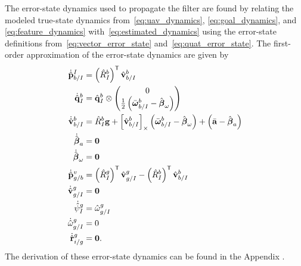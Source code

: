 The error-state dynamics used to propagate the filter are found by relating
the modeled true-state dynamics from~\eqref{eq:uav_dynamics},
\eqref{eq:goal_dynamics}, and \eqref{eq:feature_dynamics}
with~\eqref{eq:estimated_dynamics} using the error-state definitions
from~\eqref{eq:vector_error_state} and~\eqref{eq:quat_error_state}. The
first-order approximation of the error-state dynamics are given by 
\begin{align}
  \dot{\hat{\boldsymbol{\mathrm{p}}}}_{b/I}^I
  &=
  \left( \hat{R}_I^b \right)^{\mathsf{T}} \hat{\boldsymbol{\mathrm{v}}}_{b/I}^b
  \\
  \dot{\hat{\boldsymbol{\mathrm{q}}}}_{I}^{b} 
  &= 	
  \hat{\boldsymbol{\mathrm{q}}}_I^b \otimes \begin{pmatrix} 0 \\ \frac{1}{2}
  \left( \bar{\boldsymbol{\mathrm{\omega}}}_{b/I}^b - \hat{\boldsymbol{\mathrm{\beta}}}_\omega \right)
\end{pmatrix} \nonumber \\
  \dot{\hat{\boldsymbol{\mathrm{v}}}}_{b/I}^b 
  &=
  \hat{R}_I^b \boldsymbol{\mathrm{g}}
  +
  \left[ \hat{\boldsymbol{\mathrm{v}}}_{b/I}^b \right]_{\times}
  \left( \bar{\boldsymbol{\mathrm{\omega}}}_{b/I}^b - \hat{\boldsymbol{\mathrm{\beta}}}_\omega \right)
  +
  \left( \bar{\boldsymbol{\mathrm{a}}} - \hat{\boldsymbol{\mathrm{\beta}}}_a \right) \nonumber
  \\
  \dot{\hat{\boldsymbol{\mathrm{\beta}}}}_a &= \boldsymbol{\mathrm{0}} \nonumber
  \\
  \dot{\hat{\boldsymbol{\mathrm{\beta}}}}_\omega &= \boldsymbol{\mathrm{0}} \nonumber
  \\
  \dot{\hat{\boldsymbol{\mathrm{p}}}}_{g/b}^{v} &= \left( \hat{R}_{I}^{g} \right)^{\mathsf{T}}
  \hat{\boldsymbol{\mathrm{v}}}_{g/I}^{g} - \left( \hat{R}_{I}^{b} \right)^{\mathsf{T}}
  \hat{\boldsymbol{\mathrm{v}}}_{b/I}^{b} \nonumber \\
  \dot{\hat{\boldsymbol{\mathrm{v}}}}_{g/I}^{g} &= \boldsymbol{\mathrm{0}} \nonumber \\
  \dot{\hat{\psi}}_{I}^{g} &= \hat{\omega}_{g/I}^g \nonumber \\
  \dot{\hat{\omega}}_{g/I}^{g} &= 0 \nonumber \\
  \dot{\hat{\boldsymbol{\mathrm{r}}}}_{i/g}^g &= \boldsymbol{\mathrm{0}}. \nonumber
\end{align}
The derivation of these error-state dynamics can be found in the Appendix
.

